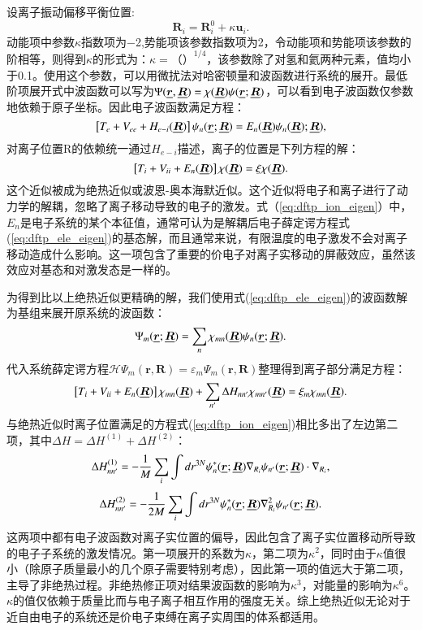 设离子振动偏移平衡位置:
\begin{equation}
  \bm{R}_i = \bm{R}^0_i + \kappa \bm{u}_i.
\end{equation}
动能项中参数$\kappa$指数项为\num{-2},势能项该参数指数项为\num{2}，令动能项和势能项该参数的阶相等，则得到$\kappa$的形式为：$\kappa=（）^{1/4}$，该参数除了对氢和氦两种元素，值均小于\num{0.1}。使用这个参数，可以用微扰法对哈密顿量和波函数进行系统的展开。最低阶项展开式中波函数可以写为$\Psi(\underline{\bm{r}},\underline{\bm{R}})=\chi(\underline{\bm{R}})\psi(\underline{\bm{r}};\underline{\bm{R}})$，可以看到电子波函数仅参数地依赖于原子坐标。因此电子波函数满足方程：
\begin{equation}\label{eq:dftp_ele_eigen}
  \left[ T_e + V_{ee} + H_{e-i}(\underline{\bm{R}}) \right]\psi_n(\underline{\bm{r}};\underline{\bm{R}}) = E_n(\underline{\bm{R}})\psi_n(\underline{\bm{R}}); \underline{\bm{R}}),
\end{equation}
对离子位置R的依赖统一通过$H_{e-i}$描述，离子的位置是下列方程的解：
\begin{equation}\label{eq:dftp_ion_eigen}
  \left[ T_i + V_{ii} + E_n(\underline{\bm{R}}) \right] \chi(\underline{\bm{R}}) = \xi \chi(\underline{\bm{R}}).
\end{equation}
这个近似被成为绝热近似或波恩-奥本海默近似。这个近似将电子和离子进行了动力学的解耦，忽略了离子移动导致的电子的激发。式（\ref{eq:dftp_ion_eigen}）中，$E_n$是电子系统的某个本征值，通常可认为是解耦后电子薛定谔方程式(\ref{eq:dftp_ele_eigen})的基态解，而且通常来说，有限温度的电子激发不会对离子移动造成什么影响。这一项包含了重要的价电子对离子实移动的屏蔽效应，虽然该效应对基态和对激发态是一样的。

为得到比以上绝热近似更精确的解，我们使用式(\ref{eq:dftp_ele_eigen})的波函数解为基组来展开原系统的波函数：
\begin{equation}
  \Psi_m(\underline{\bm{r}};\underline{\bm{R}}) = \sum_n \chi_{mn}(\underline{\bm{R}})\psi_n(\underline{\bm{r}};\underline{\bm{R}}).
\end{equation}
代入系统薛定谔方程$\mathcal{H} \Psi_m(\bm{r},\bm{R})=\mathcal{\varepsilon}_m \Psi_m(\bm{r},\bm{R})$整理得到离子部分满足方程：
\begin{equation}
  \left[ T_i + V_{ii} + E_n(\underline{\bm{R}}) \right] \chi_{mn}(\underline{\bm{R}}) + \sum_{n'}\Delta H_{nn'}\chi_{mn'}(\underline{\bm{R}}) = \xi_m \chi_{mn} (\underline{\bm{R}}).
\end{equation}
与绝热近似时离子位置满足的方程式(\ref{eq:dftp_ion_eigen})相比多出了左边第二项，其中$\Delta H=\Delta H^{(1)} + \Delta H^{(2)}$：
\begin{equation}
  \Delta H_{nn'}^{(1)} = -\frac{1}{M}\sum_i \int dr^{3N}\psi_n^*(\underline{\bm{r}};\underline{\bm{R}})\nabla_{R_i}\psi_{n'}(\underline{\bm{r}};\underline{\bm{R}})\cdot \nabla_{R_i},
\end{equation}
\begin{equation}
  \Delta H_{nn'}^{(2)} = -\frac{1}{2M}\sum_i \int dr^{3N}\psi_n^*(\underline{\bm{r}};\underline{\bm{R}})\nabla^2_{R_i}\psi_{n'}(\underline{\bm{r}};\underline{\bm{R}}).
\end{equation}
这两项中都有电子波函数对离子实位置的偏导，因此包含了离子实位置移动所导致的电子子系统的激发情况。第一项展开的系数为$\kappa$，第二项为$\kappa^2$，同时由于$\kappa$值很小（除原子质量最小的几个原子需要特别考虑），因此第一项的值远大于第二项，主导了非绝热过程。非绝热修正项对结果波函数的影响为$\kappa^3$，对能量的影响为$\kappa^6$。$\kappa$的值仅依赖于质量比而与电子离子相互作用的强度无关。综上绝热近似无论对于近自由电子的系统还是价电子束缚在离子实周围的体系都适用。

